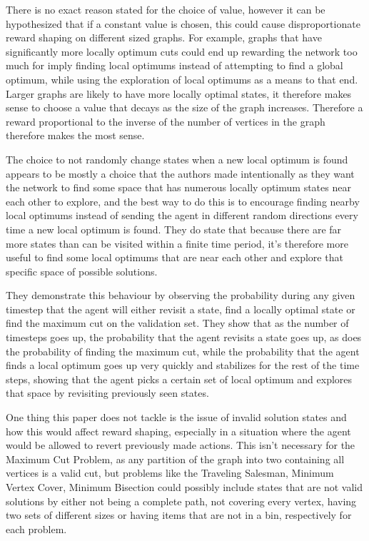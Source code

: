 \documentclass{article}
\begin{document}
There is no exact reason stated for the choice of value, however it can be hypothesized that if a constant value is chosen, this could cause disproportionate reward shaping on different sized graphs. For example, graphs that have significantly more locally optimum cuts could end up rewarding the network too much for imply finding local optimums instead of attempting to find a global optimum, while using the exploration of local optimums as a means to that end. Larger graphs are likely to have more locally optimal states, it therefore makes sense to choose a value that decays as the size of the graph increases. Therefore a reward proportional to the inverse of the number of vertices in the graph therefore makes the most sense. 

The choice to not randomly change states when a new local optimum is found appears to be mostly a choice that the authors made intentionally as they want the network to find some space that has numerous locally optimum states near each other to explore, and the best way to do this is to encourage finding nearby local optimums instead of sending the agent in different random directions every time a new local optimum is found. They do state that because there are far more states than can be visited within a finite time period, it's therefore more useful to find some local optimums that are near each other and explore that specific space of possible solutions.

They demonstrate this behaviour by observing the probability during any given timestep that the agent will either revisit a state, find a locally optimal state or find the maximum cut on the validation set. They show that as the number of timesteps goes up, the probability that the agent revisits a state goes up, as does the probability of finding the maximum cut, while the probability that the agent finds a local optimum goes up very quickly and stabilizes for the rest of the time steps, showing that the agent picks a certain set of local optimum and explores that space by revisiting previously seen states.

One thing this paper does not tackle is the issue of invalid solution states and how this would affect reward shaping, especially in a situation where the agent would be allowed to revert previously made actions. This isn't necessary for the Maximum Cut Problem, as any partition of the graph into two containing all vertices is a valid cut, but problems like the Traveling Salesman, Minimum Vertex Cover, Minimum Bisection  could possibly include states that are not valid solutions by either not being a complete path, not covering every vertex, having two sets of different sizes or having items that are not in a bin, respectively for each problem.
\end{document}
